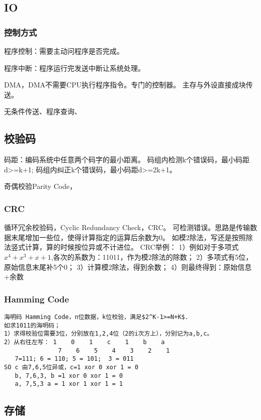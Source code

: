\documentclass[UTF8]{article}
\begin{document}
\subsection{IO}
\subsubsection{控制方式}

程序控制：需要主动问程序是否完成。

程序中断：程序运行完发送中断让系统处理。

DMA，DMA不需要CPU执行程序指令。专门的控制器。
主存与外设直接成块传送。

无条件传送、程序查询、


\subsection{校验码}


码距：编码系统中任意两个码字的最小距离。
码组内检测k个错误码，最小码距d>=k+1;
码组内纠正k个错误码，最小码距d>=2k+1。


奇偶校验Parity Code，


\subsubsection{CRC}
循环冗余校验码，Cyclic Redundancy Check，CRC。
可检测错误。思路是传输数据末尾增加一些位，使得计算指定的运算后余数为0。
如模2除法，写还是按照除法竖式计算，算的时候按位异或不计进位。
CRC举例：
1）例如对于多项式$x^4+x^3+x+1$,各次的系数为：11011，作为模2除法的除数；
2）多项式有5位，原始信息末尾补5个0；
3）计算模2除法，得到余数；
4）则最终得到：原始信息+余数

\subsubsection{Hamming Code}

\begin{lstlisting}
海明码 Hamming Code，n位数据，k位校验，满足$2^K-1>=N+K$. 
如求1011的海明码；
1）求得校验位需要3位，分别放在1,2,4位（2的i次方上），分别记为a,b,c。
2）从右往左写： 1    0    1    c    1    b    a
               7    6    5    4    3    2    1
   7=111; 6 = 110; 5 = 101;  3 = 011
SO c 由7,6,5位异或，c=1 xor 0 xor 1 = 0
   b, 7,6,3, b =1 xor 0 xor 1 = 0
   a, 7,5,3 a = 1 xor 1 xor 1 = 1
\end{lstlisting}

\subsection{存储}
\end{document}
